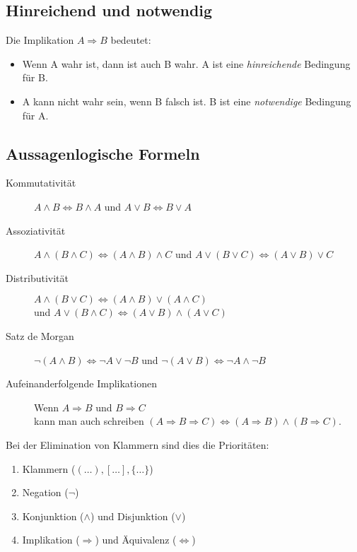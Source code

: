 \subsection{Hinreichend und notwendig}
Die Implikation $A \Rightarrow B$ bedeutet:
\begin{itemize}
  \item Wenn A wahr ist, dann ist auch B wahr. A ist eine \emph{hinreichende} Bedingung für B.
  \item A kann nicht wahr sein, wenn B falsch ist. B ist eine \emph{notwendige} Bedingung für A.
\end{itemize}

\subsection{Aussagenlogische Formeln}
\begin{description}
  \item[Kommutativität] $A \wedge B \Leftrightarrow B\wedge A$ und $A \vee B \Leftrightarrow B\vee A$
  \item[Assoziativität] $A \wedge (B \wedge C) \Leftrightarrow (A \wedge B) \wedge C$
    und $A \vee (B \vee C) \Leftrightarrow (A \vee B) \vee C$
  \item[Distributivität] $A \wedge (B \vee C) \Leftrightarrow (A \wedge B) \vee (A \wedge C)$\\
    und $A \vee (B \wedge C) \Leftrightarrow (A \vee B) \wedge (A \vee C)$
  \item[Satz de Morgan] $\neg(A \wedge B) \Leftrightarrow \neg A \vee \neg B$
    und $\neg(A \vee B) \Leftrightarrow \neg A \wedge \neg B$
  \item[Aufeinanderfolgende Implikationen] Wenn $A \Rightarrow B$ und $B \Rightarrow C$ \\ kann man auch schreiben
    $(A \Rightarrow B \Rightarrow C) \Leftrightarrow (A \Rightarrow B) \wedge (B \Rightarrow C)$.
\end{description}
Bei der Elimination von Klammern sind dies die Prioritäten:
\begin{enumerate}
  \item Klammern ($(\dots),[\dots],\{\dots\}$)
  \item Negation ($\neg$)
  \item Konjunktion ($\wedge$) und Disjunktion ($\vee$)
  \item Implikation ($\Rightarrow$) und Äquivalenz ($\Leftrightarrow$)
\end{enumerate}


